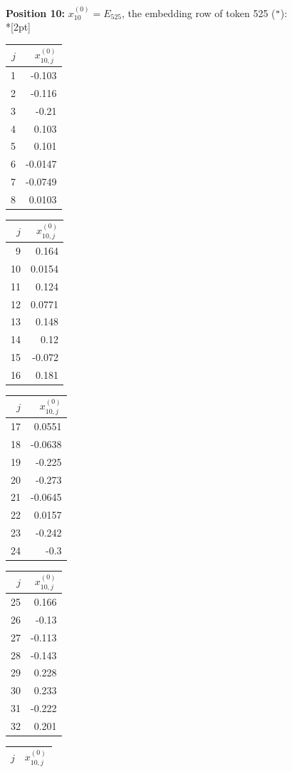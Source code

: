 \noindent \textbf{Position 10:} $x^{(0)}_{10} = E_{525}$, the embedding row of token 525 (\texttt{"}):\\*[2pt]
{\tablefont \begin{tabular}[t]{r|r}
$j$ & $x^{(0)}_{10,j}$ \\\hline
1 & -0.103 \\
2 & -0.116 \\
3 & -0.21 \\
4 & 0.103 \\
5 & 0.101 \\
6 & -0.0147 \\
7 & -0.0749 \\
8 & 0.0103
\end{tabular}\kern4pt
\begin{tabular}[t]{r|r}
$j$ & $x^{(0)}_{10,j}$ \\\hline
9 & 0.164 \\
10 & 0.0154 \\
11 & 0.124 \\
12 & 0.0771 \\
13 & 0.148 \\
14 & 0.12 \\
15 & -0.072 \\
16 & 0.181
\end{tabular}\kern4pt
\begin{tabular}[t]{r|r}
$j$ & $x^{(0)}_{10,j}$ \\\hline
17 & 0.0551 \\
18 & -0.0638 \\
19 & -0.225 \\
20 & -0.273 \\
21 & -0.0645 \\
22 & 0.0157 \\
23 & -0.242 \\
24 & -0.3
\end{tabular}\kern4pt
\begin{tabular}[t]{r|r}
$j$ & $x^{(0)}_{10,j}$ \\\hline
25 & 0.166 \\
26 & -0.13 \\
27 & -0.113 \\
28 & -0.143 \\
29 & 0.228 \\
30 & 0.233 \\
31 & -0.222 \\
32 & 0.201
\end{tabular}\kern4pt
\begin{tabular}[t]{r|r}
$j$ & $x^{(0)}_{10,j}$ \\\hline

\end{tabular}}

